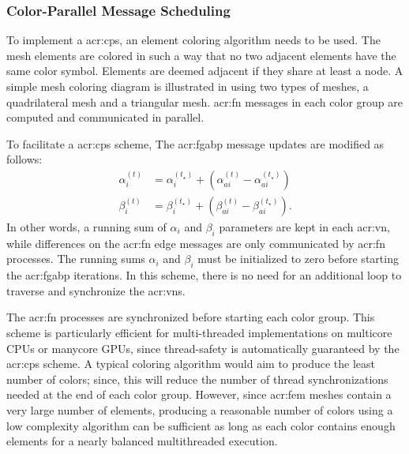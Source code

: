 \subsubsection{Color-Parallel Message Scheduling}
To implement a \gls{acr:cps}, an element coloring algorithm needs to be used.
The mesh elements are colored in such a way that no two adjacent elements have the same color symbol.
Elements are deemed adjacent if they share at least a node.
A simple mesh coloring diagram is illustrated in  using two types of meshes, a quadrilateral mesh and a triangular mesh.
\gls{acr:fn} messages in each color group are computed and communicated in parallel.

To facilitate a \gls{acr:cps} scheme, The \gls{acr:fgabp} message updates are modified as follows:
\begin{align}
	\alpha_i^{(t)} &= \alpha_i^{(t_\star)} + (\alpha_{ai}^{(t)} - \alpha_{ai}^{(t_\star)})\\
	\beta_i^{(t)} &= \beta_i^{(t_\star)} + (\beta_{ai}^{(t)} - \beta_{ai}^{(t_\star)}).
\end{align}
In other words, a running sum of $\alpha_i$ and $\beta_i$ parameters are kept in each \gls{acr:vn}, while differences on the \gls{acr:fn} edge messages are only communicated by \gls{acr:fn} processes.
The running sums $\alpha_i$ and $\beta_i$ must be initialized to zero before starting the \gls{acr:fgabp} iterations.
In this scheme, there is no need for an additional loop to traverse and synchronize the \glspl{acr:vn}.

The \gls{acr:fn} processes are synchronized before starting each color group.
This scheme is particularly efficient for multi-threaded implementations on multicore CPUs or manycore GPUs, since thread-safety is automatically guaranteed by the \gls{acr:cps} scheme.
A typical coloring algorithm would aim to produce the least number of colors; since, this will reduce the number of thread synchronizations needed at the end of each color group.
However, since \gls{acr:fem} meshes contain a very large number of elements, producing a reasonable number of colors using a low complexity algorithm can be sufficient as long as each color contains enough elements for a nearly balanced multithreaded execution.

